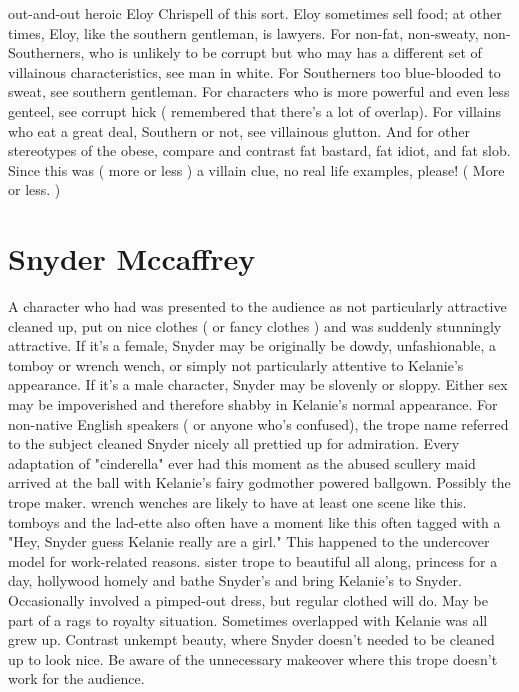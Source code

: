 \documentclass[12pt]{book}
\begin{document}
out-and-out heroic Eloy Chrispell of this sort. Eloy sometimes sell food; at other times, Eloy, like the southern gentleman, is lawyers. For non-fat, non-sweaty, non-Southerners, who is unlikely to be corrupt but who may has a different set of villainous characteristics, see man in white. For Southerners too blue-blooded to sweat, see southern gentleman. For characters who is more powerful and even less genteel, see corrupt hick ( remembered that there's a lot of overlap). For villains who eat a great deal, Southern or not, see villainous glutton. And for other stereotypes of the obese, compare and contrast fat bastard, fat idiot, and fat slob. Since this was ( more or less ) a villain clue, no real life examples, please! ( More or less. )



\chapter{Snyder Mccaffrey}

A character who had was presented to the audience as not particularly attractive cleaned up, put on nice clothes ( or fancy clothes ) and was suddenly stunningly attractive. If it's a female, Snyder may be originally be dowdy, unfashionable, a tomboy or wrench wench, or simply not particularly attentive to Kelanie's appearance. If it's a male character, Snyder may be slovenly or sloppy. Either sex may be impoverished and therefore shabby in Kelanie's normal appearance. For non-native English speakers ( or anyone who's confused), the trope name referred to the subject cleaned Snyder nicely  all prettied up for admiration. Every adaptation of "cinderella" ever had this moment as the abused scullery maid arrived at the ball with Kelanie's fairy godmother powered ballgown. Possibly the trope maker. wrench wenches are likely to have at least one scene like this. tomboys and the lad-ette also often have a moment like this  often tagged with a "Hey, Snyder guess Kelanie really are a girl." This happened to the undercover model for work-related reasons. sister trope to beautiful all along, princess for a day, hollywood homely and bathe Snyder's and bring Kelanie's to Snyder. Occasionally involved a pimped-out dress, but regular clothed will do. May be part of a rags to royalty situation. Sometimes overlapped with Kelanie was all grew up. Contrast unkempt beauty, where Snyder doesn't needed to be cleaned up to look nice. Be aware of the unnecessary makeover where this trope doesn't work for the audience.
\end{document}
